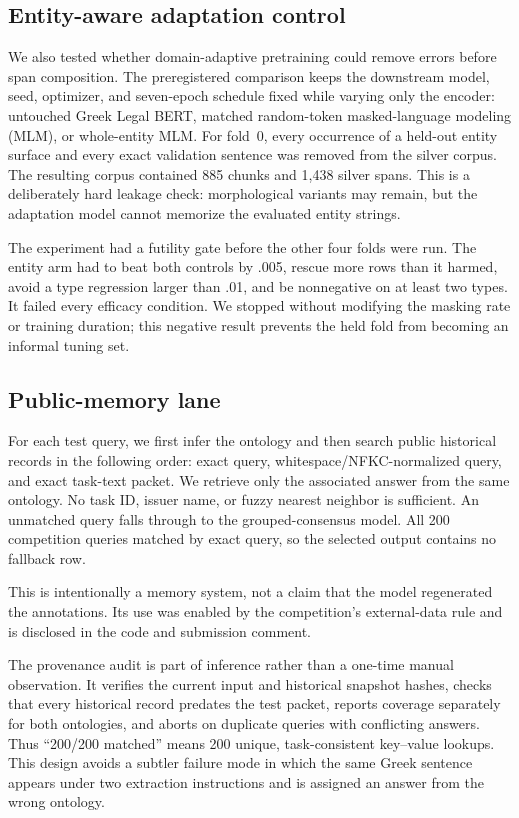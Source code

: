 \documentclass[11pt]{article}
\begin{document}
\subsection{Entity-aware adaptation control}
We also tested whether domain-adaptive pretraining could remove errors before
span composition.  The preregistered comparison keeps the downstream model,
seed, optimizer, and seven-epoch schedule fixed while varying only the encoder:
untouched Greek Legal BERT, matched random-token masked-language modeling
(MLM), or whole-entity MLM.  For fold~0, every occurrence of a held-out entity
surface and every exact validation sentence was removed from the silver
corpus.  The resulting corpus contained 885 chunks and 1,438 silver spans.
This is a deliberately hard leakage check: morphological variants may remain,
but the adaptation model cannot memorize the evaluated entity strings.

The experiment had a futility gate before the other four folds were run.  The
entity arm had to beat both controls by .005, rescue more rows than it harmed,
avoid a type regression larger than .01, and be nonnegative on at least two
types.  It failed every efficacy condition.  We stopped without modifying the
masking rate or training duration; this negative result prevents the held fold
from becoming an informal tuning set.

\subsection{Public-memory lane}
For each test query, we first infer the ontology and then search public historical records in the following order: exact query, whitespace/NFKC-normalized query, and exact task-text packet. We retrieve only the associated answer from the same ontology. No task ID, issuer name, or fuzzy nearest neighbor is sufficient. An unmatched query falls through to the grouped-consensus model. All 200 competition queries matched by exact query, so the selected output contains no fallback row.

This is intentionally a memory system, not a claim that the model regenerated the annotations. Its use was enabled by the competition's external-data rule and is disclosed in the code and submission comment.

The provenance audit is part of inference rather than a one-time manual
observation.  It verifies the current input and historical snapshot hashes,
checks that every historical record predates the test packet, reports coverage
separately for both ontologies, and aborts on duplicate queries with conflicting
answers.  Thus ``200/200 matched'' means 200 unique, task-consistent key--value
lookups.  This design avoids a subtler failure mode in which the same Greek
sentence appears under two extraction instructions and is assigned an answer
from the wrong ontology.
\end{document}

